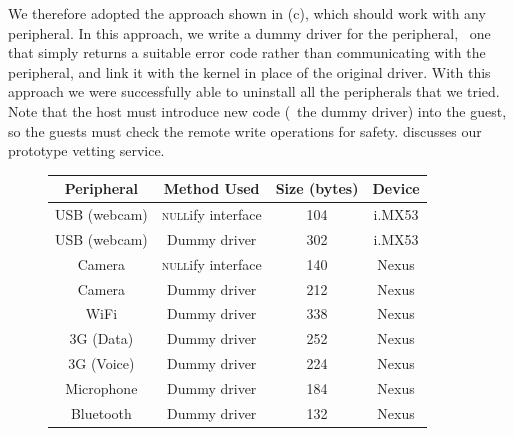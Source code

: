 We therefore adopted the approach shown in (c), which
should work with any peripheral. In this approach, we write a dummy driver for
the peripheral, \eg~one that simply returns a suitable error code rather than
communicating with the peripheral, and link it with the kernel in place of the
original driver.  With this approach we were successfully able to uninstall all
the peripherals that we tried.  Note that the host must introduce new code
(\ie~the dummy driver) into the guest, so the guests must check the remote
write operations for safety.  discusses our prototype
vetting service.

\begin{figure}[t!]
\footnotesize
\centering
\renewcommand{\arraystretch}{0.75}
\begin{tabular}{|c|c|c|c|}
\hline
\textbf{Peripheral} 
  & \textbf{Method Used} 
  & \textbf{Size (bytes)} 
  & \textbf{Device}\\
\hline
USB (webcam) & \textsc{null}ify interface & 104 & i.MX53\\
USB (webcam) & Dummy driver               & 302 & i.MX53\\
Camera       & \textsc{null}ify interface & 140 & Nexus\\
Camera       & Dummy driver               & 212 & Nexus\\
WiFi         & Dummy driver               & 338 & Nexus\\
3G (Data)    & Dummy driver               & 252 & Nexus\\
3G (Voice)   & Dummy driver               & 224 & Nexus\\
Microphone   & Dummy driver               & 184 & Nexus\\
Bluetooth    & Dummy driver               & 132 & Nexus\\
\hline
\end{tabular}
\indent\vspace{-0.25cm}
{\label{table:uninstall}}
\indent\vspace{-0.65cm}
\end{figure}

